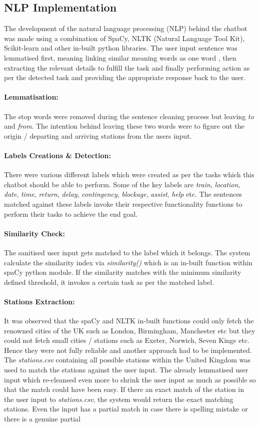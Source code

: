 \subsection{NLP Implementation}
The development of the natural language processing (NLP) behind the chatbot was made using a combination of SpaCy, NLTK (Natural Language Tool Kit), Scikit-learn and other in-built python libraries. The user input sentence was lemmatised first, meaning  linking similar meaning words as one word \cite{lemmatization}, then extracting the relevant details to fulfill the task and finally performing action as per the detected task and providing the appropriate response back to the user. \paragraph{Lemmatisation:} The stop words were removed during the sentence cleaning process but leaving \textit{to} and \textit{from}. The intention behind leaving these two words were to figure out the origin / departing and arriving stations from the users input. \paragraph{Labels Creations \& Detection:} There were various different labels which were created as per the tasks which this chatbot should be able to perform. Some of the key labels are \textit{train}, \textit{location}, \textit{date}, \textit{time}, \textit{return}, \textit{delay}, \textit{contingency}, \textit{blockage}, \textit{assist}, \textit{help} etc. The sentences matched against these labels invoke their respective functionality functions to perform their tasks to achieve the end goal. \paragraph{Similarity Check:} The sanitised user input gets matched to the label which it belongs. The system calculate the similarity index via \textit{similarity()} which is an in-built function within spaCy python module. If the similarity matches with the minimum similarity defined threshold, it invokes a certain task as per the matched label. \paragraph{Stations Extraction:} It was observed that the spaCy and NLTK in-built functions could only fetch the renowned cities of the UK such as London, Birmingham, Manchester etc but they could not fetch small cities / stations such as Exeter, Norwich, Seven Kings etc. Hence they were not fully reliable and another approach had to be implemented. The \textit{stations.csv} containing all possible stations within the United Kingdom was used to match the stations against the user input. The already lemmatised user input which re-cleansed even more to shrink the user input as much as possible so that the match could have been easy. If there an exact match of the station in the user input to \textit{stations.csv}, the system would return the exact matching stations. Even the input has a partial match in case there is spelling mistake or there is a genuine partial 